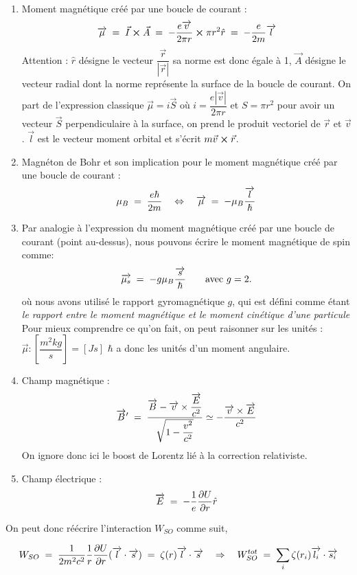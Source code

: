 \begin{enumerate}
    \item Moment magnétique créé par une boucle de courant :
    \[
        \overrightarrow{\mu} \; = \; \vec{I}\cross \vec{A} \; = \; -\dfrac{e\overrightarrow{v}}{2\pi r}\cross \pi r^2\hat{r} \; = \; -\dfrac{e}{2m}\overrightarrow{l}
    \]
    Attention : $\hat{r}$ désigne le vecteur $\dfrac{\vec{r}}{|\vec{r}|}$ sa norme est donc égale à 1, $\vec{A}$ désigne le vecteur radial dont la norme représente la surface de la boucle de courant. On part de l'expression classique $\vec{\mu} = i\vec{S}$ où $i = \dfrac{e|\vec{v}|}{2\pi r}$ et $S = \pi r^2$ pour avoir un vecteur $\vec{S}$ perpendiculaire à la surface, on prend le produit vectoriel de $\vec{r}$ et $\vec{v}$. $\vec{l}$ est le vecteur moment orbital et s'écrit $m\vec{v}\cross\vec{r}$.
    \item Magnéton de Bohr et son implication pour le moment magnétique créé par une boucle de courant :
    \[
        \mu_B \; = \; \dfrac{e\hbar}{2m} \quad \Leftrightarrow \quad \overrightarrow{\mu} \; = \; -\mu_B\dfrac{\overrightarrow{l}}{\hbar}
    \]
    \item Par analogie à l'expression du moment magnétique créé par une boucle de courant (point au-dessus), nous pouvons écrire le moment magnétique de spin comme:
    \[
        \overrightarrow{\mu_s} \; = \; -g\mu_B\dfrac{\overrightarrow{s}}{\hbar} \qquad \textrm{avec } g=2.
    \]
    où nous avons utilisé le rapport gyromagnétique $g$, qui est défini comme étant \textit{le rapport entre le moment magnétique  et le moment cinétique d'une particule}\\
    Pour mieux comprendre ce qu'on fait, on peut raisonner sur les unités : $\vec{\mu} : [\dfrac{m^2kg}{s}] = [Js]$ $\hbar$ a donc les unités d'un moment angulaire.
    \item Champ magnétique :
    \[
        \overrightarrow{B}' \; = \; \dfrac{\overrightarrow{B} - \overrightarrow{v}\times \dfrac{\overrightarrow{E}}{c^2}}{\sqrt{1-\dfrac{v^2}{c^2}}} \simeq -\dfrac{\overrightarrow{v}\times \overrightarrow{E}}{c^2}
    \]
    On ignore donc ici le boost de Lorentz lié à la correction relativiste.
    \item Champ électrique :
    \[
        \overrightarrow{E} \; = \;  -\dfrac{1}{e}\dfrac{\partial U}{\partial r}\hat{r}
    \]
\end{enumerate}

On peut donc réécrire l'interaction $W_{SO}$ comme suit,

\begin{equation}
    W_{SO} \; = \;  \dfrac{1}{2m^2c^2}\dfrac{1}{r}\dfrac{\partial U}{\partial r}(\overrightarrow{l}\cdot\overrightarrow{s}) \; = \;  \zeta(r)\overrightarrow{l}\cdot\overrightarrow{s}
    \quad\Rightarrow\quad
    W_{SO}^{tot} \; = \; \sum_i\zeta(r_i)\overrightarrow{l_i}\cdot\overrightarrow{s_i}
    \label{eq:Hamilt_SO}
\end{equation}

